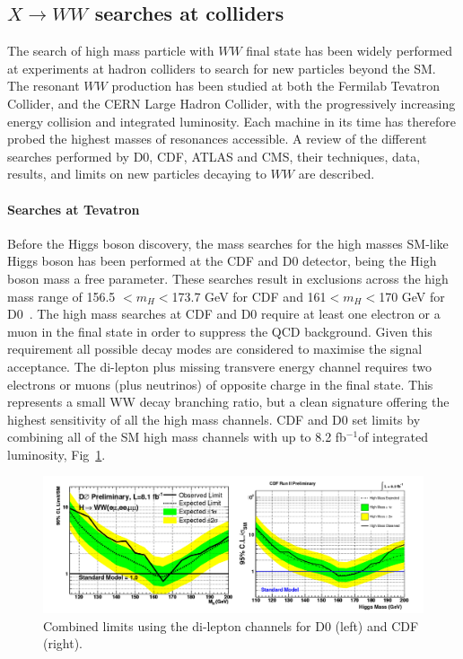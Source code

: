 \subsection*{$X \to WW$ searches at colliders}
The search of high mass particle with  $WW$ final state  has been widely performed at experiments at hadron
colliders to search for new particles beyond the SM. 
The resonant $WW$ production has been studied at both the Fermilab Tevatron Collider, and the CERN Large
Hadron Collider, with the progressively increasing energy collision and integrated
luminosity. Each machine in its time has therefore probed the highest masses of
 resonances accessible. A review of the different searches
performed by D0, CDF, ATLAS and CMS, their techniques, data, results, and
limits on new particles decaying to $WW$ are described. 

\paragraph{Searches at Tevatron} Before the Higgs boson discovery, the mass  searches for the high masses SM-like Higgs boson has been performed at the CDF
and D0 detector, being the High boson mass a free parameter. 
These searches result in exclusions across the high mass range of 156.5 $<m_H<$173.7 GeV for CDF and 161$<m_H<$170 GeV for D0~\cite{Petridis:2012jd}. 
The high mass searches at CDF and D0 require at least one electron or a muon in the final state in order to suppress the QCD background. Given this requirement all possible decay  modes  are  considered  to  maximise  the  signal  acceptance. The di-lepton plus missing transvere energy channel requires two electrons or muons (plus neutrinos) of opposite charge in the final state. This represents a small WW decay branching ratio, but a clean signature offering the highest sensitivity  of  all  the  high  mass  channels. 
CDF and D0 set limits by combining all of the SM high mass channels with up to 8.2 fb$^{-1}$of integrated luminosity, Fig~\ref{tevatron}.

\begin{figure}
\centering
\includegraphics[scale= 0.33]{../Cap1/tevatron}
\caption{Combined limits using the di-lepton channels for D0 (left) and CDF (right).}
\label{tevatron}
\end{figure}

